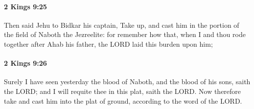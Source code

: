 		\paragraph{2 Kings 9:25} %
			\label{2KINGS-9-25}

			Then said Jehu to Bidkar his captain, Take up, and cast him in the portion of the field of Naboth the Jezreelite: for remember how that, when I and thou rode together after Ahab his father, the LORD laid this burden upon him;


		\paragraph{2 Kings 9:26} %
			\label{2KINGS-9-26}

			Surely I have seen yesterday the blood of Naboth, and the blood of his sons, saith the LORD; and I will requite thee in this plat, saith the LORD. Now therefore take and cast him into the plat of ground, according to the word of the LORD.

